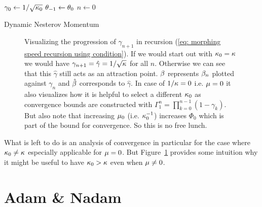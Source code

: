 \begin{algorithm}
	\(\gamma_0 \leftarrow 1/\sqrt{\kappa_0}\)
	\(\theta_{-1} \leftarrow \theta_0\)\;
	\(n\leftarrow 0\)\;
	\caption{Dynamic Nesterov Momentum\label{algo: dynamic nesterov momentum}}
\end{algorithm}

\begin{figure}[h]
	\centering
	\def\svgwidth{1\textwidth}
	
	\caption{
		Visualizing the progression of \(\gamma_{n+1}\) in recursion (\ref{eq:
		morphing speed recursion using condition}). If we would start out with
		\(\kappa_0=\kappa\) we would have \(\gamma_{n+1}=\hat{\gamma}=1/\sqrt{\kappa}\)
		for all \(n\). Otherwise we can see that this \(\hat{\gamma}\) still
		acts as an attraction point. \(\beta\) represents \(\beta_n\)
		plotted against \(\gamma_n\) and \(\hat{\beta}\) corresponds
		to \(\hat{\gamma}\).
		In case of \(1/\kappa=0\) i.e. \(\mu=0\)
		it also visualizes how it is helpful to select a different \(\kappa_0\)
		as convergence bounds are constructed with
		\(\Gamma_1^n=\prod_{k=0}^{n-1}(1-\gamma_k)\).
		But also note that increasing \(\mu_0\) (i.e. \(\kappa_0^{-1}\))
		increases \(\Phi_0\) which is part of the bound for convergence. So
		this is no free lunch.
	}
	\label{fig: gamma path}
\end{figure}

What is left to do is an analysis of convergence in particular for the case
where \(\kappa_0\neq\kappa\) especially applicable for \(\mu=0\).
But Figure~\ref{fig: gamma path} provides some intuition why it might be useful to
have \(\kappa_0>\kappa\) even when \(\mu\neq0\).


\section{Adam \& Nadam}


\endinput
